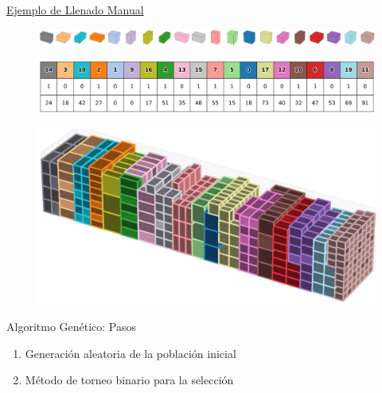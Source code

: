 \documentclass[handout]{beamer}
\begin{document}
\begin{frame}{\href{https://raw.githubusercontent.com/josegustavo/lcp/main/lcp/presentation/pic/lcp.gif}{Ejemplo de Llenado Manual}}
    \begin{figure}
        \centering
        \includegraphics[width=.8\textwidth]{pic/cubos.png}
    \end{figure}
    \begin{figure}
        \centering
        \includegraphics[width=.8\textwidth]{pic/tabla_colores_3x20.png}
    \end{figure}
    \begin{figure}
        \centering
        \includegraphics[width=.8\textwidth]{pic/contenedor-lleno.png}
    \end{figure}
\end{frame}

\begin{frame}{Algoritmo Genético: Pasos}
    \begin{enumerate}[<+-| alert@+>]
        \item Generación aleatoria de la población inicial
        \item Método de torneo binario para la selección
    \end{enumerate}
\end{frame}
\end{document}

